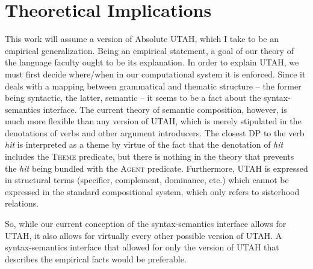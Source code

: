 \documentclass[letterpaper]{article}
\begin{document}
\section{Theoretical Implications}
This work will assume a version of  Absolute UTAH, which I take to be an empirical generalization.
Being an empirical statement, a goal of our theory of the language faculty ought to be its explanation.
In order to explain UTAH, we must first decide where/when in our computational system it is enforced.
Since it deals with a mapping between grammatical and thematic structure -- the former being syntactic, the latter, semantic -- it seems to be a fact about the syntax-semantics interface.
The current theory of semantic composition, however, is much more flexible than any version of UTAH, which is merely stipulated in the denotations of verbs and other argument introducers.
The closest DP to the verb \textit{hit} is interpreted as a theme by virtue of the fact that the denotation of \textit{hit} includes the \textsc{Theme} predicate, but there is nothing in the theory that prevents the \textit{hit} being bundled with the \textsc{Agent} predicate.
Furthermore, UTAH is expressed in structural terms (specifier, complement, dominance, etc.) which cannot be expressed in the standard compositional system, which only refers to sisterhood relations. 

So, while our current conception of the syntax-semantics interface allows for UTAH, it also allows for virtually every other possible version of UTAH.
A syntax-semantics interface that allowed for only the version of UTAH that describes the empirical facts would be preferable.

\printbibliography
\end{document}
